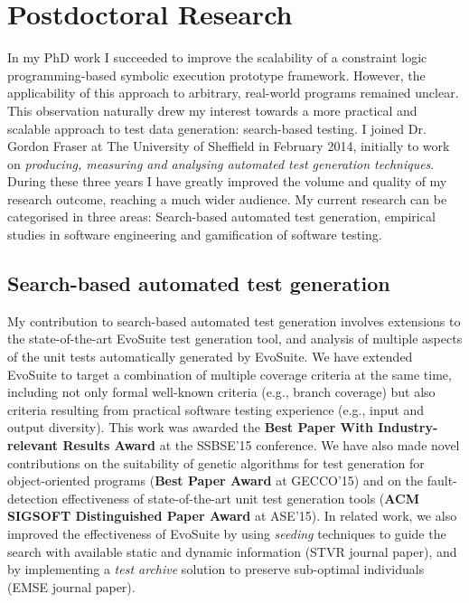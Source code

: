 \documentclass[a4paper]{article}
\begin{document}

\section{Postdoctoral Research}

In my PhD work I succeeded to improve the scalability of a constraint
logic programming-based symbolic execution prototype
framework. However, the applicability of this approach to arbitrary,
real-world programs remained unclear. This observation naturally drew
my interest towards a more practical and scalable approach to test
data generation: search-based testing. I joined Dr. Gordon Fraser at
The University of Sheffield in February 2014, initially to work on
\emph{producing, measuring and analysing automated test generation
  techniques}. During these three years I have greatly improved the
volume and quality of my research outcome, reaching a much wider
audience. My current research can be categorised in three areas:
Search-based automated test generation, empirical studies in software
engineering and gamification of software testing.

\subsection{Search-based automated test generation}

My contribution to search-based automated test generation involves
extensions to the state-of-the-art EvoSuite test generation tool, and
analysis of multiple aspects of the unit tests automatically generated
by EvoSuite. We have extended EvoSuite to target a combination of
multiple coverage criteria at the same time, including not only formal
well-known criteria (e.g., branch coverage) but also criteria
resulting from practical software testing experience (e.g., input and
output diversity). This work was awarded the \textbf{Best Paper With
  Industry-relevant Results Award} at the SSBSE'15 conference. We have
also made novel contributions on the suitability of genetic algorithms
for test generation for object-oriented programs (\textbf{Best Paper
  Award} at GECCO'15) and on the fault-detection effectiveness of
state-of-the-art unit test generation tools (\textbf{ACM SIGSOFT
  Distinguished Paper Award} at ASE'15). In related work, we also
improved the effectiveness of EvoSuite by using \emph{seeding}
techniques to guide the search with available static and dynamic
information (STVR journal paper), and by implementing a \emph{test
  archive} solution to preserve sub-optimal individuals (EMSE journal
paper).
\end{document}

